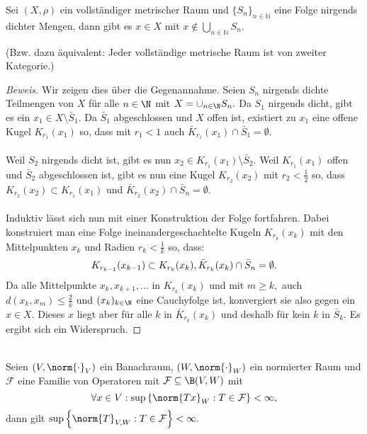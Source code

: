 \begin{theorem} \label{baire_kat}
	Sei $(X, \rho)$ ein vollständiger metrischer Raum und $\{S_n\}_{n \in \mathbb{N}}$ eine Folge nirgends dichter Mengen, dann gibt es $x \in X$ mit $x \notin \bigcup_{n \in \mathbb{N}} S_n$.
	
	(Bzw. dazu äquivalent: Jeder vollständige metrische Raum ist von zweiter Kategorie.)
	
	\begin{proof}[Beweis]
		Wir zeigen dies über die Gegenannahme. Seien $S_n$ nirgends dichte Teilmengen von $X$ für alle $n \in \N$ mit $X = \cup_{n \in \N}S_n.$ Da $S_1$ nirgends dicht, gibt es ein $x_1 \in X \setminus \bar S_1.$ Da $\bar S_1$ abgeschlossen und $X$ offen ist, existiert zu $x_1$ eine offene Kugel $K_{r_1}(x_1)$ so, dass mit $r_1 < 1$ auch $\bar K_{r_1}(x_1) \cap \bar S_1 = \emptyset.$ \\ \\ Weil $S_2$ nirgends dicht ist, gibt es nun $x_2 \in K_{r_1}(x_1) \setminus \bar S_2.$ Weil $K_{r_1}(x_1)$ offen und $\bar S_2$ abgeschlossen ist, gibt es nun eine Kugel $K_{r_2}(x_2)$ mit $r_2 < \frac{1}{2}$ so, dass $K_{r_2}(x_2) \subset K_{r_1}(x_1)$ und $\bar K_{r_2}(x_2) \cap \bar S_n = \emptyset.$ \\ \\ Induktiv lässt sich nun mit einer Konstruktion der Folge fortfahren. Dabei konstruiert man eine Folge ineinandergeschachtelte Kugeln $K_{r_k}(x_k)$ mit den Mittelpunkten $x_k$ und Radien $r_k < \frac{1}{k}$ so, dass: \[K_{r_{k-1}}(x_{k-1}) \subset K_{r_{k}}(x_{k}), \\ \bar K_{r_{k}}(x_{k}) \cap \bar S_n = \emptyset.\] Da alle Mittelpunkte $x_k, x_{k+1}, ...$ in $K_{r_{k}}(x_{k})$ und mit $m \geq k,$ auch $d(x_k, x_m) \leq \frac{2}{k}$ und $(x_k)_{k \in \N}$ eine Cauchyfolge ist, konvergiert sie also gegen ein $x \in X.$ Dieses $x$ liegt aber für alle $k$ in $\bar K_{r_{k}}(x_{k})$ und deshalb für kein $k$ in $\bar S_k.$ Es ergibt sich ein Widerspruch.  		
	\end{proof}


\begin{theorem} \label{Banach_Steinhaus} \\
	Seien $(V, \norm{\cdot}_V)$ ein Banachraum, $(W, \norm{\cdot}_W)$ ein normierter Raum und $\mathcal{F}$ eine Familie von Operatoren mit $\mathcal{F} \subseteq \B(V, W)$ mit 
	\[
	\forall x \in V: \sup{\left\{\norm{Tx}_W: T \in \mathcal{F}\right\}} < \infty,
	\] 
	dann gilt $\sup{\left\{\norm{T}_{V, W}: T \in \mathcal{F}\right\}} < \infty.$
	

\end{theorem}
\end{theorem}
